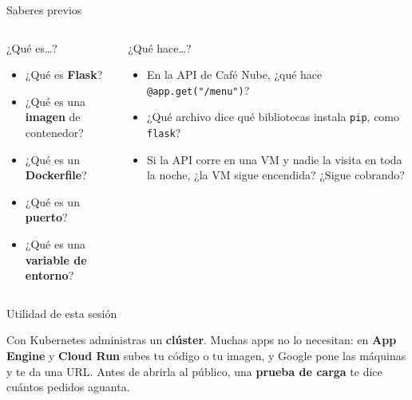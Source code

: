 \documentclass[aspectratio=169,10pt,c]{beamer}
\begin{document}
\begin{frame}{Saberes previos}
\begin{columns}[T,onlytextwidth]
\begin{block}{¿Qué es…?}
\begin{itemize}\setlength\itemsep{8pt}
  \item ¿Qué es \textbf{Flask}?
  \item ¿Qué es una \textbf{imagen} de contenedor?
  \item ¿Qué es un \textbf{Dockerfile}?
  \item ¿Qué es un \textbf{puerto}?
  \item ¿Qué es una \textbf{variable de entorno}?
\end{itemize}
\end{block}
\begin{block}{¿Qué hace…?}
\begin{itemize}\setlength\itemsep{8pt}
  \item En la API de Café Nube, ¿qué hace \texttt{@app.get("/menu")}?
  \item ¿Qué archivo dice qué bibliotecas instala \texttt{pip}, como \texttt{flask}?
  \item Si la API corre en una VM y nadie la visita en toda la noche, ¿la VM sigue encendida? ¿Sigue cobrando?
\end{itemize}
\end{block}
\end{columns}
\end{frame}

\begin{frame}[c]{Utilidad de esta sesión}
\begin{center}
\begin{minipage}{.84\textwidth}
{\large Con Kubernetes administras un \textbf{clúster}. Muchas apps no lo necesitan: en \textbf{App Engine} y \textbf{Cloud Run} subes tu código o tu imagen, y Google pone las máquinas y te da una URL. Antes de abrirla al público, una \textbf{prueba de carga} te dice cuántos pedidos aguanta.}
\end{minipage}
\end{center}
\end{frame}
\end{document}
